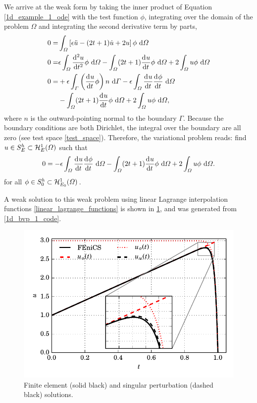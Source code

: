   We arrive at the weak form by taking the inner product of Equation \cref{1d_example_1_ode} with the test function $\phi$, integrating over the domain of the problem $\Omega$ and integrating the second derivative term by parts,
  \begin{align*}
    0 = &\int_{\Omega} \left[ \epsilon \ddot{u} - (2t + 1)\dot{u} + 2u \right] \phi \d{\Omega} \\
    0 = &\epsilon \int_{\Omega} \totder[2]{u}{t} \phi \d{\Omega} - \int_{\Omega} (2t + 1) \totder{u}{t} \phi \d{\Omega} + 2\int_{\Omega} u \phi \d{\Omega} \\
    0 = &+\epsilon \int_{\Gamma} \left( \totder{u}{t} \phi \right) n \d{\Gamma} - \epsilon \int_{\Omega} \totder{u}{t} \totder{\phi}{t} \d{\Omega} \\
    &- \int_{\Omega} (2t + 1) \totder{u}{t} \phi \d{\Omega} + 2\int_{\Omega} u \phi \d{\Omega},
  \end{align*}
  where $n$ is the outward-pointing normal to the boundary $\Gamma$.  Because the boundary conditions are both Dirichlet, the integral over the boundary are all zero (see test space \cref{test_space}).  Therefore, the variational problem reads: find $u \in \trialspace$ such that 
  \begin{align*}
    0 = - \epsilon \int_{\Omega} \totder{u}{t} \totder{\phi}{t} \d{\Omega} - \int_{\Omega} (2t + 1) \totder{u}{t} \phi \d{\Omega} + 2\int_{\Omega} u \phi \d{\Omega}.
  \end{align*}
  for all $\phi \in \testspace$.
    
  A weak solution to this weak problem using linear Lagrange interpolation functions \cref{linear_lagrange_functions} is shown in \cref{1d_bvp_1_image}, and was generated from \cref{1d_bvp_1_code}.

  
  \begin{figure}
    \centering
      \includegraphics[width=\linewidth]{images/fenics_intro/1D_BVP_1.pdf}
    \caption[Singular-perturbation solution]{Finite element (solid black) and singular perturbation (dashed black) solutions.}
    \label{1d_bvp_1_image}
  \end{figure}


